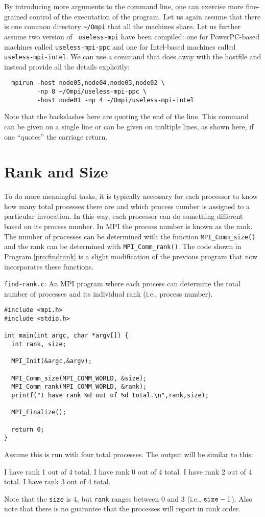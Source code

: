 By introducing more arguments to the command line, one can exercise more
fine-grained control of the executation of the program.  Let us again
assume that there is one common directory \verb+~/Ompi+ that all the
machines share.  Let us further assume two version of {\tt
  useless-mpi} have been compiled: one for PowerPC-based machines
called {\tt useless-mpi-ppc} and one for Intel-based machines called
{\tt useless-mpi-intel}.  We can use a command that does away with the
hostfile and instead provide all the details explicitly:
\begin{verbatim}
  mpirun -host node05,node04,node03,node02 \
         -np 8 ~/Ompi/useless-mpi-ppc \
         -host node01 -np 4 ~/Ompi/useless-mpi-intel
\end{verbatim}
Note that the backslashes here are quoting the end of the line.  This
command can be given on a single line or can be given on multiple
lines, as shown here, if one ``quotes'' the carriage return.

\section{Rank and Size}

To do more meaningful tasks, it is typically necessary for each
processor to know how many total processes there are and which process
number is assigned to a particular invocation.  In this way, each
processor can do something different based on its process number.  In
MPI the process number is known as the rank.  The number of processes
can be determined with the function {\tt MPI\_Comm\_size()} and the
rank can be determined with {\tt MPI\_Comm\_rank()}.  The code shown
in Program \ref{pro:findrank} is a slight modification of the previous
program that now incorporates these functions.

\begin{program}
{\tt find-rank.c}: An MPI program where each process can determine the
total number of processes and its individual rank (i.e., process
number).  \label{pro:findrank}
\codemiddle
\begin{lstlisting}
#include <mpi.h>
#include <stdio.h>

int main(int argc, char *argv[]) {
  int rank, size;

  MPI_Init(&argc,&argv);

  MPI_Comm_size(MPI_COMM_WORLD, &size);
  MPI_Comm_rank(MPI_COMM_WORLD, &rank);
  printf("I have rank %d out of %d total.\n",rank,size);

  MPI_Finalize();

  return 0;
}
\end{lstlisting}
\end{program}
Assume this is run with four total processes.  The output will be
similar to this:
\begin{code}
  I have rank 1 out of 4 total.
  I have rank 0 out of 4 total.
  I have rank 2 out of 4 total.
  I have rank 3 out of 4 total.
\end{code}
Note that the {\tt size} is $4$, but {\tt rank} ranges between $0$ and
$3$ (i.e., ${\tt size}-1$).  Also note that there is no guarantee that
the processes will report in rank order.

